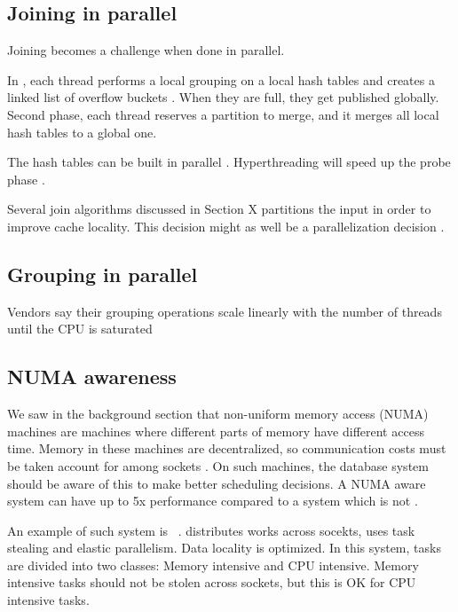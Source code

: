 \subsection{Joining in parallel}
\label{sub:Joining in parallel}
Joining becomes a challenge when done in parallel.

In \ibm, each thread performs a local grouping on a local hash tables and creates a linked list of overflow buckets \cite{Raman2013-em}. When they are full, they get published globally. Second phase, each thread reserves a partition to merge, and it merges all local hash tables to a global one.

The hash tables can be built in parallel \cite{Barber2014-ey}. Hyperthreading will speed up the probe phase .

Several join algorithms discussed in Section X partitions the input in order to improve cache locality. This decision might as well be a parallelization decision \cite{Neumann1011-uq}.

\subsection{Grouping in parallel}
\label{sub:Grouping in parallel}
Vendors say their grouping operations scale linearly with the number of threads until the CPU is saturated \cite{Farber2012-vh}


\subsection{NUMA awareness}
\label{sub:NUMA awareness}
We saw in the background section that non-uniform memory access (NUMA) machines are machines where different parts of memory have different access time. Memory in these machines are decentralized, so communication costs must be taken account for among sockets \cite{Psaroudakis2015-lc}. On such machines, the database system should be aware of this to make better scheduling decisions. A NUMA aware system can have up to 5x performance compared to a system which is not \cite{Psaroudakis2015-lc}. 

An example of such system is \hyper~\cite{Psaroudakis2014-ma, Psaroudakis2015-lc}. \hyper distributes works across socekts, uses task stealing and elastic parallelism. Data locality is optimized. In this system, tasks are divided into two classes: Memory intensive and CPU intensive. Memory intensive tasks should not be stolen across sockets, but this is OK for CPU intensive tasks.

